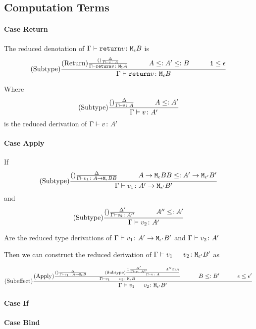 \documentclass{report}
\begin{document}
    \subsection{Computation Terms}
    \paragraph{Case Return}
    The reduced denotation of $\Gamma \vdash \texttt{return} v \colon \texttt{M}_{\epsilon}{B}$ is 
    $$
        \treerule{Subtype}
        {
            \treerule{Return}
            {\treerule{}{\D}{\gtyperelation{v}{A}}}
            {\gtyperelation{\return{v}}{\M{\1}{A}}}
            \s\s
            A \subtype A' \subtype B
            \s\s
            \1 \subeffect \e
        }
        {\gtyperelation{\return{v}}{\meb}}
    $$

    Where $$\deltavrule{\G}{v}{A}{A'}$$ is the reduced derivation of $\Gamma \vdash v \colon A'$
    
    \paragraph{Case Apply}
    If 
    $$
        \deltavrule{\G}{v_1}{\lamtype{A}{\e}{BB}}{\lamtype{A'}{\e'}{B'}}
    $$ and $$
        \deltavruleprime{\G}{v_2}{A''}{A'}
    $$

    Are the reduced type derivations of $\Gamma \vdash v_1 \colon A' \rightarrow \texttt{M}_{\epsilon'}{B'}$ and $\Gamma \vdash v_2 \colon A'$



    Then we can construct the reduced derivation of $\gtyperelation{\apply{v_1}{v_2}}{\M{\e'}{B'}}$ as

    $$
        \treerule{Subeffect}{
            \treerule{Apply}{
                \treerule{}{\D}{
                    \gtyperelation{v_1}{\lamtype{A}{\e}{B}}
                }
                \s\s
                \treerule{Subtype}{
                    \treerule{}{\D'}{
                        \gtyperelation{v}{A''}
                    } \s\s A'' \subtype A
                }
                {\gtyperelation{v}{A}}
            }{
                \gtyperelation{\apply{v_1}{v_2}}{\meb}
            }
            \s\s
            B \subtype B'
            \s\s
            \e \subeffect \e'
        }{
            \gtyperelation{\apply{v_1}{v_2}}{\M{\e'}{B'}}
        }
    $$
    \paragraph{Case If}
    \paragraph{Case Bind}
\end{document}
